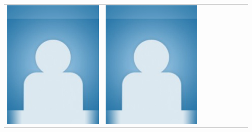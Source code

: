 \documentclass[landscape,a0paper,fontscale=0.292]{baposter}
\begin{document}
\begin{poster}
{\begin{center}
\begin{tabularx}{\linewidth}{X X X X X X X X X}
{\centering \includegraphics[width=0.65\linewidth]{MISSING.jpg}}&
{\centering \includegraphics[width=0.65\linewidth]{MISSING.jpg}}&

\end{tabularx}
\end{center}}
\end{poster}
\end{document}
